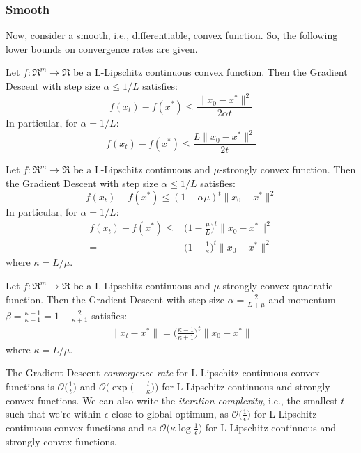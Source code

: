 
\subsubsection{Smooth}

Now, consider a smooth, i.e., differentiable, convex function. So, the following lower bounds on convergence rates are given.

\begin{theorem} \label{thm:cvx_gd_convergence}
Let $f: \Re^m \rightarrow \Re$ be a L-Lipschitz continuous convex function. Then the Gradient Descent with step size $\alpha \leq 1/L$ satisfies:
$$
f(x_t) - f(x^*) \leq \frac{\| x_0 - x^* \|^2}{2 \alpha t}
$$
In particular, for $\alpha = 1/L$:
$$
f(x_t) - f(x^*) \leq \frac{L \| x_0 - x^* \|^2}{2 t}
$$
\end{theorem}

\begin{theorem} \label{thm:str_cvx_gd_convergence}
Let $f: \Re^m \rightarrow \Re$ be a L-Lipschitz continuous and $\mu$-strongly convex function. Then the Gradient Descent with step size $\alpha \leq 1/L$ satisfies:
$$
f(x_t) - f(x^*) \leq (1 - \alpha \mu)^t \| x_0 - x^* \|^2
$$
In particular, for $\alpha = 1/L$:
$$
\begin{aligned}
	f(x_t) - f(x^*) \leq & \bigg(1 - \frac{\mu}{L}\bigg)^t \| x_0 - x^* \|^2 \\
						= & \bigg(1 - \frac{1}{\kappa}\bigg)^t \| x_0 - x^* \|^2
\end{aligned}
$$
where $\kappa = L/\mu$.
\end{theorem}

\begin{theorem} \label{thm:quad_gd_convergence}
Let $f: \Re^m \rightarrow \Re$ be a L-Lipschitz continuous and $\mu$-strongly convex quadratic function. Then the Gradient Descent with step size $\alpha = \displaystyle \frac{2}{L + \mu}$ and momentum $\beta = \displaystyle \frac{\kappa-1}{\kappa+1} = 1 - \frac{2}{\kappa+1}$ satisfies:
$$
\begin{aligned}
	\| x_t - x^* \| = \bigg(\frac{\kappa-1}{\kappa+1}\bigg)^t \| x_0 - x^* \|
\end{aligned}
$$
where $\kappa = L/\mu$.
\end{theorem}

The Gradient Descent \emph{convergence rate} for L-Lipschitz continuous convex functions is $\displaystyle \mathcal{O}\Bigg(\frac{1}{t}\Bigg)$ and $\displaystyle \mathcal{O}\Bigg(\exp\Bigg(-\frac{t}{\kappa}\Bigg)\Bigg)$ for L-Lipschitz continuous and strongly convex functions. We can also write the \emph{iteration complexity}, i.e., the smallest $t$ such that we’re within $\epsilon$-close to global optimum, as $\displaystyle \mathcal{O}\Bigg(\frac{1}{\epsilon}\Bigg)$ for L-Lipschitz continuous convex functions and as $\displaystyle \mathcal{O}\Bigg(\kappa \log \frac{1}{\epsilon}\Bigg)$ for L-Lipschitz continuous and strongly convex functions.


